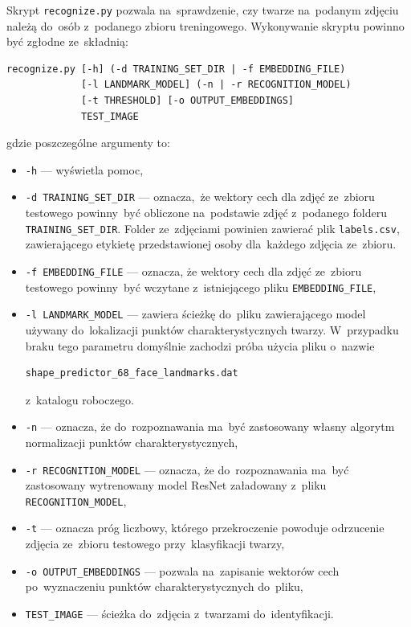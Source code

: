 \documentclass[11pt,a4paper]{article}
\begin{document}
Skrypt \texttt{recognize.py} pozwala na~sprawdzenie, czy twarze na~podanym zdjęciu należą do~osób z~podanego zbioru treningowego.
Wykonywanie skryptu powinno być zgłodne ze~składnią:

\begin{minipage}{\linewidth}
\begin{verbatim}
recognize.py [-h] (-d TRAINING_SET_DIR | -f EMBEDDING_FILE)
             [-l LANDMARK_MODEL] (-n | -r RECOGNITION_MODEL)
             [-t THRESHOLD] [-o OUTPUT_EMBEDDINGS]
             TEST_IMAGE
\end{verbatim}
\end{minipage}

gdzie poszczególne argumenty to:
\begin{itemize}
    \item \verb+-h+ --- wyświetla pomoc,
    \item \verb+-d TRAINING_SET_DIR+ --- oznacza, że wektory cech dla zdjęć ze~zbioru testowego powinny~być obliczone na~podstawie zdjęć z~podanego folderu \verb+TRAINING_SET_DIR+.
        Folder ze~zdjęciami powinien zawierać plik \verb+labels.csv+, zawierającego etykietę przedstawionej osoby dla~każdego zdjęcia ze~zbioru.
    \item \verb+-f EMBEDDING_FILE+ --- oznacza, że wektory cech dla zdjęć ze~zbioru testowego powinny~być wczytane z~istniejącego pliku \verb+EMBEDDING_FILE+,
    \item \verb+-l LANDMARK_MODEL+ --- zawiera ścieżkę do~pliku zawierającego model używany do~lokalizacji punktów charakterystycznych twarzy.
        W~przypadku braku tego parametru domyślnie zachodzi próba użycia pliku o~nazwie
        \begin{verbatim}shape_predictor_68_face_landmarks.dat\end{verbatim}
        z~katalogu roboczego.
    \item \verb+-n+ --- oznacza, że do~rozpoznawania ma~być zastosowany własny algorytm normalizacji punktów charakterystycznych,
    \item \verb+-r RECOGNITION_MODEL+ --- oznacza, że do~rozpoznawania ma~być zastosowany wytrenowany model ResNet załadowany z~pliku \verb+RECOGNITION_MODEL+,
    \item \verb+-t+ --- oznacza próg liczbowy, którego przekroczenie powoduje odrzucenie zdjęcia ze~zbioru testowego przy~klasyfikacji twarzy,
    \item \verb+-o OUTPUT_EMBEDDINGS+ --- pozwala na~zapisanie wektorów cech po~wyznaczeniu punktów charakterystycznych do~pliku,
    \item \verb+TEST_IMAGE+ --- ścieżka do~zdjęcia z~twarzami do~identyfikacji.
\end{itemize}
\end{document}
